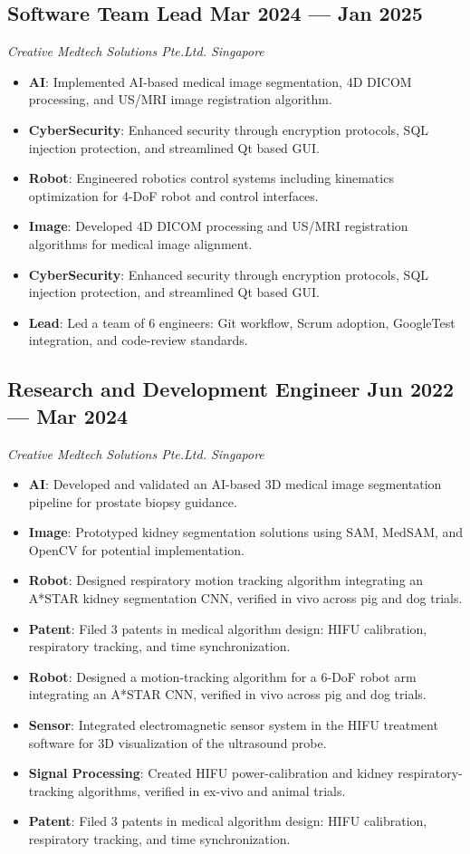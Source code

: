 \documentclass[a4paper,10pt]{article}
\newif\ifaimlver
\newif\ifallver
\newcommand{\subtextit}[1]{
\vspace{0cm} 
\textit{ #1 
\vspace{-0.1cm}} }
\newenvironment{zitemize}{
\vspace{0.06cm}
\begin{itemize}\itemsep 1pt \parskip 1pt \parsep 3pt}
{\end{itemize}\vspace{-0.32cm}}
\newcommand{\FKcorrect}{\item \textbf{Robot}:
Engineered robotics control systems including kinematics optimization for 4-DoF robot and control interfaces.}
\newcommand{\AIgeneral}{\item \textbf{AI}:
Implemented AI-based medical image segmentation, 4D DICOM processing, and US/MRI image registration algorithm.}
\newcommand{\HIFUTrack}{\item \textbf{Signal Processing}:
Created HIFU power-calibration and kidney respiratory-tracking algorithms, verified in ex-vivo and animal trials.}
\newcommand{\Cybersecurity}{\item \textbf{CyberSecurity}:
Enhanced security through encryption protocols, SQL injection protection, and streamlined Qt based GUI.
}
\newcommand{\Patents}{\item \textbf{Patent}:
Filed 3 patents in medical algorithm design: HIFU calibration, respiratory tracking, and time synchronization.}
\newcommand{\Emtrack}{\item \textbf{Sensor}:
Integrated electromagnetic sensor system in the HIFU treatment software for 3D visualization of the ultrasound probe.}
\newcommand{\TrackOnlyCNN}{\item \textbf{Robot}:
Designed respiratory motion tracking algorithm integrating an A*STAR kidney segmentation CNN, verified in vivo across pig and dog trials.}
\newcommand{\AIOnly}{\item \textbf{AI}:
Developed and validated an AI-based 3D medical image segmentation pipeline for prostate biopsy guidance.}
\newcommand{\SAM}{\item \textbf{Image}:
 Prototyped kidney segmentation solutions using SAM, MedSAM, and OpenCV for potential implementation.}
\newcommand{\ImageOnly}{\item \textbf{Image}:
Developed 4D DICOM processing and US/MRI registration algorithms for medical image alignment.}
\newcommand{\TrackOnlyRobot}{\item \textbf{Robot}:
Designed a motion-tracking algorithm for a 6-DoF robot arm integrating an A*STAR CNN, verified in vivo across pig and dog trials.}
\begin{document}
\subsection*{ \large Software Team Lead \hfill Mar 2024 --- Jan 2025 } 
\subtextit{Creative Medtech Solutions Pte.Ltd. \hfill Singapore} 
\begin{zitemize}
\ifallver
    \FKcorrect
    \AIgeneral
    \Cybersecurity
\else\ifaimlver
    \AIgeneral
    \Cybersecurity
\else
    \FKcorrect
    \ImageOnly
    \Cybersecurity
\fi\fi
    \item \textbf{Lead}: Led a team of 6 engineers: Git workflow, Scrum adoption, GoogleTest integration, and code-review standards.
\end{zitemize}

\subsection*{\large Research and Development Engineer \hfill Jun 2022 --- Mar 2024 } 
\subtextit{Creative Medtech Solutions Pte.Ltd. \hfill Singapore} 
    \begin{zitemize}
    \justifying
\ifallver
        \TrackOnlyRobot
        \AIOnly
        \SAM
        \Emtrack
        \HIFUTrack
        \Patents
\else\ifaimlver
        \AIOnly
        \SAM
        \TrackOnlyCNN
        \Patents
\else
        \TrackOnlyRobot
        \Emtrack
        \HIFUTrack
        \Patents
\fi\fi
    \end{zitemize}

\ifallver
\subsection*{\large Research Assistant --- Internship \hfill Jul 2018 --- Sep 2018}
\subtextit{Beijing Surgerii Technology Co., Ltd. and Kii Lab of SJTU under Professor Kai Xu \hfill Shanghai, China}
\begin{zitemize}
    \item Conducted 20+ experiments to evaluate the three-dimensional positioning algorithm of a multi-backbone robot.
    \item Assembled and tested the motor-driven part of a surgical robot arm to ensure fundamental functions.
    \item Analyzed needle insertion experiment results and redesigned mechanical structure using AutoCAD for improved performance.
\end{zitemize}
\fi

\end{document}
